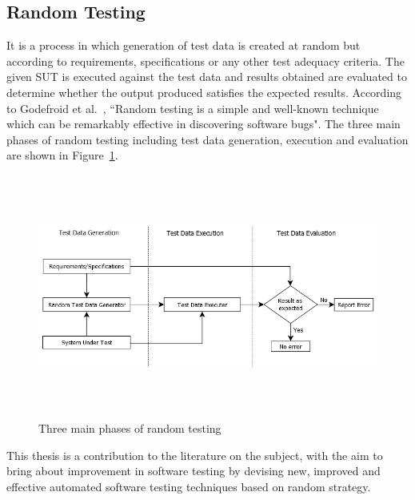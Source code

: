 \subsection{Random Testing} 
It is a process in which generation of test data is created at random but according to requirements, specifications or any other test adequacy criteria. The given SUT is executed against the test data and results obtained are evaluated to determine whether the output produced satisfies the expected results. According to Godefroid et al.~\cite{godefroid2005dart}, ``Random testing is a simple and well-known technique which can be remarkably effective in discovering software bugs". The three main phases of random testing including test data generation, execution and evaluation are shown in Figure~\ref{fig:SoftwareTesting1}.
\\
\begin{figure}[h]
	\centering
		\includegraphics[width=15.3cm, height=8cm ]{chapter1/SoftwareTesting1.png}
		\bigskip
		\caption{Three main phases of random testing}
	\label{fig:SoftwareTesting1}
\end{figure}

This thesis is a contribution to the literature on the subject, with the aim to bring about improvement in software testing by devising new, improved and effective automated software testing techniques based on random strategy.
\newpage
